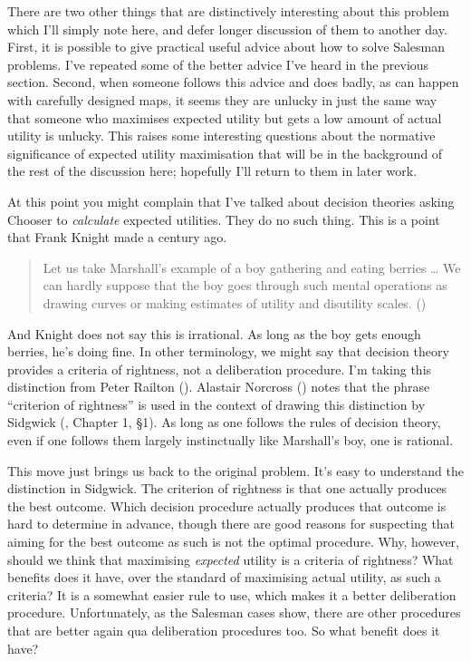 \documentclass[
  10pt,
  letterpaper,
  DIV=11,
  numbers=noendperiod,
  twoside]{scrartcl}
\begin{document}
There are two other things that are distinctively interesting about this
problem which I'll simply note here, and defer longer discussion of them
to another day. First, it is possible to give practical useful advice
about how to solve Salesman problems. I've repeated some of the better
advice I've heard in the previous section. Second, when someone follows
this advice and does badly, as can happen with carefully designed maps,
it seems they are unlucky in just the same way that someone who
maximises expected utility but gets a low amount of actual utility is
unlucky. This raises some interesting questions about the normative
significance of expected utility maximisation that will be in the
background of the rest of the discussion here; hopefully I'll return to
them in later work.

At this point you might complain that I've talked about decision
theories asking Chooser to \emph{calculate} expected utilities. They do
no such thing. This is a point that Frank Knight made a century ago.

\begin{quote}
Let us take Marshall's example of a boy gathering and eating berries
\ldots{} We can hardly suppose that the boy goes through such mental
operations as drawing curves or making estimates of utility and
disutility scales. ()
\end{quote}

And Knight does not say this is irrational. As long as the boy gets
enough berries, he's doing fine. In other terminology, we might say that
decision theory provides a criteria of rightness, not a deliberation
procedure. I'm taking this distinction from Peter Railton
(). Alastair Norcross
() notes that the phrase ``criterion of
rightness'' is used in the context of drawing this distinction by
Sidgwick (, Chapter 1, §1). As
long as one follows the rules of decision theory, even if one follows
them largely instinctually like Marshall's boy, one is rational.

This move just brings us back to the original problem. It's easy to
understand the distinction in Sidgwick. The criterion of rightness is
that one actually produces the best outcome. Which decision procedure
actually produces that outcome is hard to determine in advance, though
there are good reasons for suspecting that aiming for the best outcome
as such is not the optimal procedure. Why, however, should we think that
maximising \emph{expected} utility is a criteria of rightness? What
benefits does it have, over the standard of maximising actual utility,
as such a criteria? It is a somewhat easier rule to use, which makes it
a better deliberation procedure. Unfortunately, as the Salesman cases
show, there are other procedures that are better again qua deliberation
procedures too. So what benefit does it have?
\end{document}
